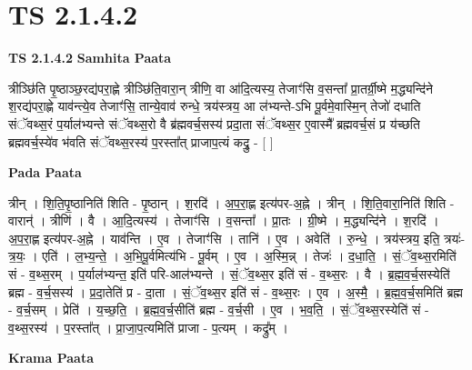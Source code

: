 \documentclass[17pt]{extarticle}
\begin{document}
\section{ TS 2.1.4.2 }

\textbf{TS 2.1.4.2 } \newline
\textbf{Samhita Paata} \newline

त्रीञ्छि॑ति पृ॒ष्ठाञ्छ॒रद्य॑परा॒ह्णे त्रीञ्छि॑ति॒वारा॒न् त्रीणि॒ वा आ॑दि॒त्यस्य॒ तेजाꣳ॑सि व॒सन्ता᳚ प्रा॒तर्ग्री॒ष्मे म॒द्ध्यन्दि॑ने श॒रद्य॑परा॒ह्णे याव॑न्त्ये॒व तेजाꣳ॑सि॒ तान्ये॒वाव॑ रुन्धे॒ त्रय॑स्त्रय॒ आ ल॑भ्यन्ते-ऽभि पू॒र्वमे॒वास्मि॒न् तेजो॑ दधाति संॅवथ्स॒रं प॒र्याल॑भ्यन्ते संॅवथ्स॒रो वै ब्र॑ह्मवर्च॒सस्य॑ प्रदा॒ता सं॑ॅवथ्स॒र ए॒वास्मै᳚ ब्रह्मवर्च॒सं प्र य॑च्छति ब्रह्मवर्च॒स्ये॑व भ॑वति संॅवथ्स॒रस्य॑ प॒रस्ता᳚त् प्राजाप॒त्यं कद्रु॒ - [  ] \newline

\textbf{Pada Paata} \newline

त्रीन् । शि॒ति॒पृ॒ष्ठानिति॑ शिति - पृ॒ष्ठान् । श॒रदि॑ । अ॒प॒रा॒ह्ण इत्य॑पर-अ॒ह्ने । त्रीन् । शि॒ति॒वारा॒निति॑ शिति - वारान्॑ । त्रीणि॑ । वै । आ॒दि॒त्यस्य॑ । तेजाꣳ॑सि । व॒सन्ता᳚ । प्रा॒तः । ग्री॒ष्मे । म॒द्ध्यन्दि॑ने । श॒रदि॑ । अ॒प॒रा॒ह्ण इत्य॑पर-अ॒ह्ने । याव॑न्ति । ए॒व । तेजाꣳ॑सि । तानि॑ । ए॒व । अवेति॑ । रु॒न्धे॒ । त्रय॑स्त्रय॒ इति॒ त्रयः॑-त्र॒यः॒ । एति॑ । ल॒भ्य॒न्ते॒ । अ॒भि॒पू॒र्वमित्य॑भि - पू॒र्वम् । ए॒व । अ॒स्मि॒न्न् । तेजः॑ । द॒धा॒ति॒ । सं॒ॅव॒थ्स॒रमिति॑ सं - व॒थ्स॒रम् । प॒र्याल॑भ्यन्त॒ इति॑ परि-आल॑भ्यन्ते । सं॒ॅव॒थ्स॒र इति॑ सं - व॒थ्स॒रः । वै । ब्र॒ह्म॒व॒र्च॒सस्येति॑ ब्रह्म - व॒र्च॒सस्य॑ । प्र॒दा॒तेति॑ प्र - दा॒ता । सं॒ॅव॒थ्स॒र इति॑ सं - व॒थ्स॒रः । ए॒व । अ॒स्मै॒ । ब्र॒ह्म॒व॒र्च॒समिति॑ ब्रह्म - व॒र्च॒सम् । प्रेति॑ । य॒च्छ॒ति॒ । ब्र॒ह्म॒व॒र्च॒सीति॑ ब्रह्म - व॒र्च॒सी । ए॒व । भ॒व॒ति॒ । सं॒ॅव॒थ्स॒रस्येति॑ सं - व॒थ्स॒रस्य॑ । प॒रस्ता᳚त् । प्रा॒जा॒प॒त्यमिति॑ प्राजा - प॒त्यम् । कद्रु᳚म् ।  \newline


\textbf{Krama Paata} \newline
\end{document}
